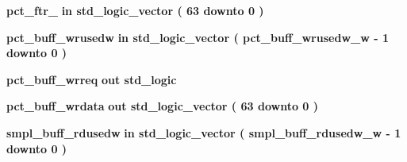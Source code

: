 \begin{DoxyCompactItemize}
\item 
{\bf pct\+\_\+ftr\+\_}  {\bfseries {\bfseries \textcolor{keywordflow}{in}\textcolor{vhdlchar}{ }}} {\bfseries \textcolor{comment}{std\+\_\+logic\+\_\+vector}\textcolor{vhdlchar}{ }\textcolor{vhdlchar}{(}\textcolor{vhdlchar}{ }\textcolor{vhdlchar}{ } \textcolor{vhdldigit}{63} \textcolor{vhdlchar}{ }\textcolor{keywordflow}{downto}\textcolor{vhdlchar}{ }\textcolor{vhdlchar}{ } \textcolor{vhdldigit}{0} \textcolor{vhdlchar}{ }\textcolor{vhdlchar}{)}\textcolor{vhdlchar}{ }} 
\item 
{\bf pct\+\_\+buff\+\_\+wrusedw}  {\bfseries {\bfseries \textcolor{keywordflow}{in}\textcolor{vhdlchar}{ }}} {\bfseries \textcolor{comment}{std\+\_\+logic\+\_\+vector}\textcolor{vhdlchar}{ }\textcolor{vhdlchar}{(}\textcolor{vhdlchar}{ }\textcolor{vhdlchar}{ }\textcolor{vhdlchar}{ }\textcolor{vhdlchar}{ }{\bfseries {\bf pct\+\_\+buff\+\_\+wrusedw\+\_\+w}} \textcolor{vhdlchar}{-\/}\textcolor{vhdlchar}{ } \textcolor{vhdldigit}{1} \textcolor{vhdlchar}{ }\textcolor{keywordflow}{downto}\textcolor{vhdlchar}{ }\textcolor{vhdlchar}{ } \textcolor{vhdldigit}{0} \textcolor{vhdlchar}{ }\textcolor{vhdlchar}{)}\textcolor{vhdlchar}{ }} 
\item 
{\bf pct\+\_\+buff\+\_\+wrreq}  {\bfseries {\bfseries \textcolor{keywordflow}{out}\textcolor{vhdlchar}{ }}} {\bfseries \textcolor{comment}{std\+\_\+logic}\textcolor{vhdlchar}{ }} 
\item 
{\bf pct\+\_\+buff\+\_\+wrdata}  {\bfseries {\bfseries \textcolor{keywordflow}{out}\textcolor{vhdlchar}{ }}} {\bfseries \textcolor{comment}{std\+\_\+logic\+\_\+vector}\textcolor{vhdlchar}{ }\textcolor{vhdlchar}{(}\textcolor{vhdlchar}{ }\textcolor{vhdlchar}{ } \textcolor{vhdldigit}{63} \textcolor{vhdlchar}{ }\textcolor{keywordflow}{downto}\textcolor{vhdlchar}{ }\textcolor{vhdlchar}{ } \textcolor{vhdldigit}{0} \textcolor{vhdlchar}{ }\textcolor{vhdlchar}{)}\textcolor{vhdlchar}{ }} 
\item 
{\bf smpl\+\_\+buff\+\_\+rdusedw}  {\bfseries {\bfseries \textcolor{keywordflow}{in}\textcolor{vhdlchar}{ }}} {\bfseries \textcolor{comment}{std\+\_\+logic\+\_\+vector}\textcolor{vhdlchar}{ }\textcolor{vhdlchar}{(}\textcolor{vhdlchar}{ }\textcolor{vhdlchar}{ }\textcolor{vhdlchar}{ }\textcolor{vhdlchar}{ }{\bfseries {\bf smpl\+\_\+buff\+\_\+rdusedw\+\_\+w}} \textcolor{vhdlchar}{-\/}\textcolor{vhdlchar}{ } \textcolor{vhdldigit}{1} \textcolor{vhdlchar}{ }\textcolor{keywordflow}{downto}\textcolor{vhdlchar}{ }\textcolor{vhdlchar}{ } \textcolor{vhdldigit}{0} \textcolor{vhdlchar}{ }\textcolor{vhdlchar}{)}\textcolor{vhdlchar}{ }} 

\end{DoxyCompactItemize}
